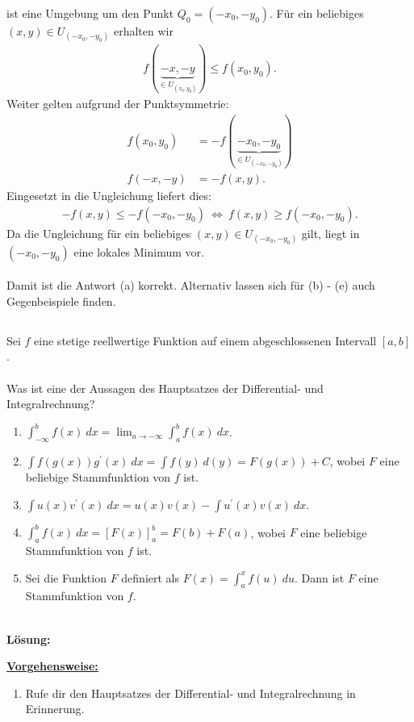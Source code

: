 ist eine Umgebung um den Punkt $Q_0 = (-x_0,-y_0)$.
Für ein beliebiges $(x,y) \in U_{(-x_0,-y_0)}  $ erhalten wir
\begin{align*}
	f(\underbrace{-x,-y}_{  \in U_{(x_0,y_0) }}) \leq f(x_0, y_0). 
\end{align*}
Weiter gelten aufgrund der Punktsymmetrie:
\begin{align*}
	f(x_0, y_0) &= - f(\underbrace{-x_0,-y_0}_{ \in U_{(-x_0,-y_0) }})\\
	f(-x,-y)  &= -f(x,y).
\end{align*}
Eingesetzt in die Ungleichung liefert dies:
\begin{align*}
	-f(x,y) \leq - f(-x_0, -y_0)
	\ \Leftrightarrow \
	f(x,y) \geq f(-x_0,-y_0).
\end{align*}
Da die Ungleichung für ein beliebiges $(x,y) \in U_{(-x_0,-y_0)} $ gilt, liegt in $(-x_0,-y_0)$ eine lokales Minimum vor.\\
\\
Damit ist die Antwort (a) korrekt. Alternativ lassen sich für (b) - (e) auch Gegenbeispiele finden.

\newpage
\subsection*{}
Sei $f$ eine stetige reellwertige Funktion auf einem abgeschlossenen Intervall $[a,b]$.\\
\\
Was ist eine der Aussagen des Hauptsatzes der Differential- und Integralrechnung?
\renewcommand{\labelenumi}{(\alph{enumi})}
\begin{enumerate}
	\item 
	$\int_{-\infty}^b f(x) \ dx = 
	\lim_{a \to -\infty} \int_{a}^b f(x) \ dx
	$.
	\item 
	$\int f(g(x)) g^\prime(x) \ dx
	= \int f(y) \ d(y)
	= F(g(x) ) + C
	$, wobei $F$ eine beliebige Stammfunktion von $f$ ist.
	\item 
	$\int u(x) v^\prime(x) \ dx = u(x) v(x)  - \int u^\prime(x) v(x) \ dx$.
	\item 
	$\int_a^b f(x) \ dx
	=\left[F(x)\right]_a^b= F(b) +F(a)
	$, wobei $F$ eine beliebige Stammfunktion von $f$ ist.
	\item 
	Sei die Funktion $F$ definiert als $F(x) = \int_a^x f(u) \ du$.
	Dann ist $F$ eine Stammfunktion von $f$.
\end{enumerate}
\ \\
\textbf{Lösung:}
\begin{mdframed}
\underline{\textbf{Vorgehensweise:}}
\renewcommand{\labelenumi}{\theenumi.}
\begin{enumerate}
\item Rufe dir den Hauptsatzes der Differential- und Integralrechnung in Erinnerung.
\end{enumerate}
\end{mdframed}

